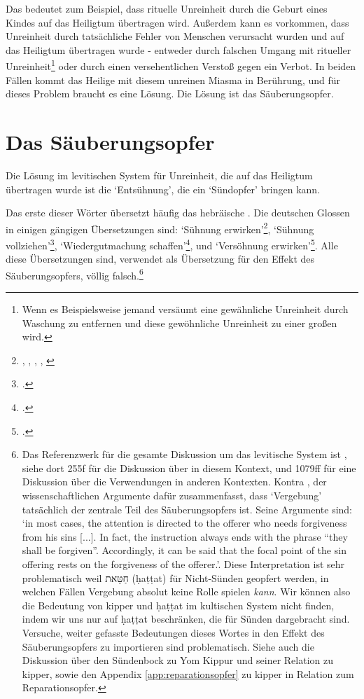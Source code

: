 Das bedeutet zum Beispiel, dass rituelle Unreinheit durch die Geburt eines Kindes auf das Heiligtum übertragen wird.
Außerdem kann es vorkommen, dass Unreinheit durch tatsächliche Fehler von Menschen verursacht wurden und auf das Heiligtum übertragen wurde -
entweder durch falschen Umgang mit ritueller Unreinheit\footnote{
Wenn es Beispielsweise jemand versäumt eine gewähnliche Unreinheit durch Waschung zu entfernen und diese gewöhnliche Unreinheit zu einer großen wird.}
oder durch einen versehentlichen Verstoß gegen ein Verbot.
In beiden Fällen kommt das Heilige mit diesem unreinen Miasma in Berührung, und für dieses Problem braucht es eine Lösung.
Die Lösung ist das Säuberungsopfer.

\section{Das Säuberungsopfer}
Die Lösung im levitischen System für Unreinheit, die auf das Heiligtum übertragen wurde ist die `Entsühnung', die ein `Sündopfer' bringen kann.

Das erste dieser Wörter übersetzt häufig das hebräische \kipper.
Die deutschen Glossen in einigen gängigen Übersetzungen sind:
`Sühnung erwirken'\footnote{\Cite{elb}, \Cite{meng}, \Cite{neü}, \Cite{ngü}, \Cite{slt}}, `Sühnung vollziehen'\Footcite{lut}, `Wiedergutmachung schaffen'\Footcite{nlb}, und `Versöhnung erwirken'\Footcite{eü}.
Alle diese Übersetzungen sind, verwendet als Übersetzung für den Effekt des Säuberungsopfers, völlig falsch.\footnote{
Das Referenzwerk für die gesamte Diskussion um das levitische System ist \Cite{milgrom-leviticus-1}, siehe dort 255f für die Diskussion über \kipper in diesem Kontext, und 1079ff für eine Diskussion über die Verwendungen in anderen Kontexten.
Kontra \Cite[84f]{yamaguchi-pauline-soteriology}, der wissenschaftlichen Argumente dafür zusammenfasst, dass `Vergebung' tatsächlich der zentrale Teil des Säuberungsopfers ist.
Seine Argumente sind: `in most cases, the attention is directed to the offerer who needs forgiveness from his sins [...].
In fact, the instruction always ends with the phrase ``they shall be forgiven''.
Accordingly, it can be said that the focal point of the sin offering rests on the forgiveness of the offerer.'.
Diese Interpretation ist sehr problematisch weil חַטָּאת (ḥaṭṭat) für Nicht-Sünden geopfert werden, in welchen Fällen Vergebung absolut keine Rolle spielen \textit{kann}.
Wir können also die Bedeutung von kipper und ḥaṭṭat im kultischen System nicht finden, indem wir uns nur auf ḥaṭṭat beschränken, die für Sünden dargebracht sind.
Versuche, weiter gefasste Bedeutungen dieses Wortes in den Effekt des Säuberungsopfers zu importieren sind problematisch.
Siehe auch die Diskussion über den Sündenbock zu Yom Kippur und seiner Relation zu kipper, sowie den Appendix \ref{app:reparationsopfer} zu kipper in Relation zum Reparationsopfer.}

